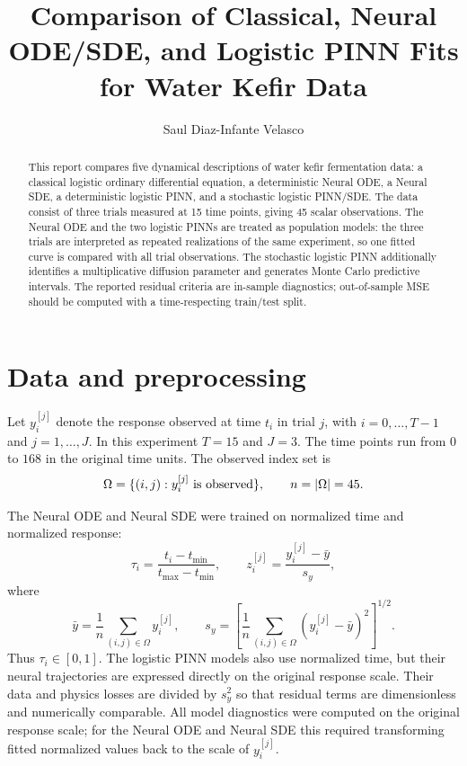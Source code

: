 \documentclass[11pt]{article}
\title{Comparison of Classical, Neural ODE/SDE, and Logistic PINN Fits for Water Kefir Data}
\author{Saul Diaz-Infante Velasco}
\date{}
\begin{document}
\maketitle

\begin{abstract}
    This report compares five dynamical descriptions of water kefir
    fermentation data: a classical logistic ordinary differential equation, a
    deterministic Neural ODE, a Neural SDE, a deterministic logistic PINN, and a
    stochastic logistic PINN/SDE. The data consist of three trials measured at
    15 time points, giving 45 scalar observations. The Neural ODE and the two
    logistic PINNs are treated as population models: the three trials are
    interpreted as repeated realizations of the same experiment, so one fitted
    curve is compared with all trial observations. The stochastic logistic PINN
    additionally identifies a multiplicative diffusion parameter and generates
    Monte Carlo predictive intervals. The reported residual criteria are
    in-sample diagnostics; out-of-sample MSE should be computed with a
    time-respecting train/test split.
\end{abstract}

\section{Data and preprocessing}

        Let $y_i^{[j]}$ denote the response observed at time $t_i$ in trial $j$,
    with $i=0,\ldots,T-1$ and $j=1,\ldots,J$. In this experiment $T=15$ and
    $J=3$. The time points run from $0$ to $168$ in the original time units.
    The observed index set is
    $$
    \Omega = \{(i,j): y_i^{[j]}\ \hbox{is observed}\},
    \qquad n = |\Omega| = 45.
    $$

        The Neural ODE and Neural SDE were trained on normalized time and
    normalized response:
    $$
        \tau_i = \frac{t_i-t_{\min}}{t_{\max}-t_{\min}},
        \qquad
        z_i^{[j]} = \frac{y_i^{[j]}-\bar y}{s_y},
    $$
    where
    $$
        \bar y = \frac{1}{n}\sum_{(i,j)\in\Omega} y_i^{[j]},
        \qquad
        s_y =
            \left[
                \frac{1}{n}\sum_{(i,j)\in\Omega}(y_i^{[j]}-\bar y)^2
            \right]^{1/2}.
    $$
    Thus $\tau_i\in[0,1]$. The logistic PINN models also use normalized time,
    but their neural trajectories are expressed directly on the original
    response scale. Their data and physics losses are divided by $s_y^2$ so
    that residual terms are dimensionless and numerically comparable. All model
    diagnostics were computed on the original response scale; for the Neural
    ODE and Neural SDE this required transforming fitted normalized values back
    to the scale of $y_i^{[j]}$.
\end{document}
